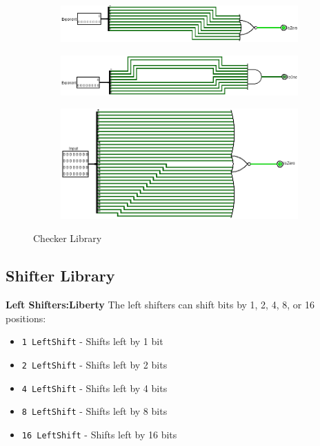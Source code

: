 \documentclass[a4paper,12pt]{article}
\begin{document}
\begin{figure}[H]
    \centering
    \begin{subfigure}[b]{0.45\textwidth}
        \centering
        \includegraphics[width=\textwidth]{0_checker.png}
    \end{subfigure}
    \hfill
    \begin{subfigure}[b]{0.45\textwidth}
        \centering
        \includegraphics[width=\textwidth]{1_checker.png}
    \end{subfigure}
    \hfill
    \begin{subfigure}[b]{0.45\textwidth}
        \centering
        \includegraphics[width=\textwidth]{32bit_0_checker.png}
    \end{subfigure}
    \caption{Checker Library}
\end{figure}

\subsection{Shifter Library}

\textbf{Left Shifters:Liberty} The left shifters can shift bits by 1, 2, 4, 8, or 16 positions:
\begin{itemize}
    \item \texttt{1 LeftShift} - Shifts left by 1 bit
    \item \texttt{2 LeftShift} - Shifts left by 2 bits
    \item \texttt{4 LeftShift} - Shifts left by 4 bits
    \item \texttt{8 LeftShift} - Shifts left by 8 bits
    \item \texttt{16 LeftShift} - Shifts left by 16 bits
\end{itemize}
\end{document}
